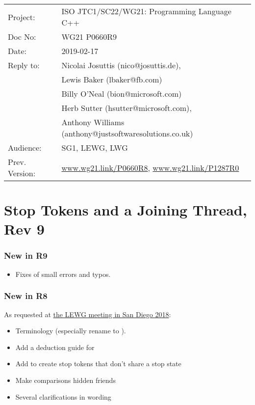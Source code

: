 
{\small
\begin{tabular}{@{}ll}
Project:  	& ISO JTC1/SC22/WG21: Programming Language C++ \\
Doc No: 	& WG21 P0660R9 \\
Date: 		& 2019-02-17 \\
Reply to: 	& Nicolai Josuttis (nico@josuttis.de), \\
                &         Lewis Baker (lbaker@fb.com) \\
                &         Billy O'Neal (bion@microsoft.com) \\
                &         Herb Sutter (hsutter@microsoft.com), \\
                &         Anthony Williams (anthony@justsoftwaresolutions.co.uk) \\
Audience: 	& SG1, LEWG, LWG \\
Prev. Version:	& \url{www.wg21.link/P0660R8}, \url{www.wg21.link/P1287R0} \\
\end{tabular}
}

\section*{{\huge{}Stop Tokens and a Joining Thread, Rev 9}}

\subsubsection*{New in R9}
\begin{itemize}
 \item Fixes of small errors and typos.
\end{itemize}

\subsubsection*{New in R8}
As requested at
\href{http://wiki.edg.com/bin/view/Wg21sandiego2018/P0660}{the LEWG meeting in San Diego 2018}:
\begin{itemize}
 \item Terminology (especially rename  to ).
 \item Add a deduction guide for 
 \item Add  to create stop tokens that don't share a stop state
 \item Make comparisons hidden friends
 \item Several clarifications in wording
\end{itemize}

